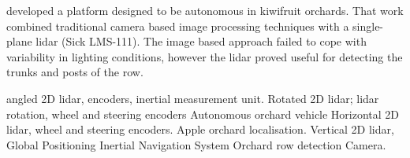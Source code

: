 \documentclass[preprint,authoryear,12pt]{elsarticle}
\begin{document}
        \cite{Scarfe2012} developed a platform designed to be autonomous in kiwifruit orchards.
        That work combined traditional camera based image processing techniques with a single-plane lidar (Sick LMS-111).
        The image based approach failed to cope with variability in lighting conditions, however the lidar proved useful for detecting the trunks and posts of the row.
        











        \cite{Freitas2012} angled 2D lidar, encoders, inertial measurement unit.
        \cite{Zhang2014} Rotated 2D lidar; lidar rotation, wheel and steering encoders
        \cite{Bergerman2015} Autonomous orchard vehicle Horizontal 2D lidar, wheel and steering encoders.
        \cite{Bargoti2015} Apple orchard localisation. Vertical 2D lidar, Global Positioning Inertial Navigation System
        \cite{Sharifi2015} Orchard row detection Camera.

\end{document}
